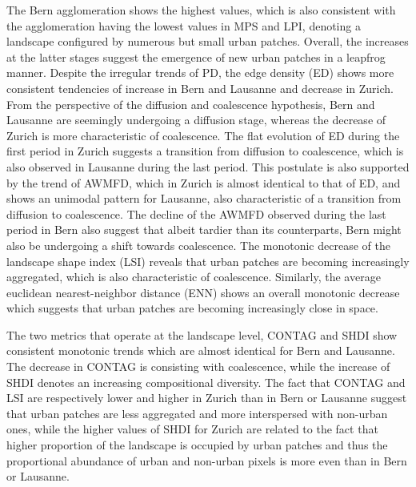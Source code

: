 \documentclass[10pt,letterpaper]{article}
\begin{document}
The Bern agglomeration shows the highest values, which is also consistent with the agglomeration having the lowest values in MPS and LPI, denoting a landscape configured by numerous but small urban patches.
Overall, the increases at the latter stages suggest the emergence of new urban patches in a leapfrog manner.
Despite the irregular trends of PD, the edge density (ED) shows more consistent tendencies of increase in Bern and Lausanne and decrease in Zurich. From the perspective of the diffusion and coalescence hypothesis, Bern and Lausanne are seemingly undergoing a diffusion stage, whereas the decrease of Zurich is more characteristic of coalescence. %
The flat evolution of ED during the first period in Zurich suggests a transition from diffusion to coalescence, which is also observed in Lausanne during the last period.
This postulate is also supported by the trend of AWMFD, which in Zurich is almost identical to that of ED, and shows an unimodal pattern for Lausanne, also characteristic of a transition from diffusion to coalescence. The decline of the AWMFD observed during the last period in Bern also suggest that albeit tardier than its counterparts, Bern might also be undergoing a shift towards coalescence.
The monotonic decrease of the landscape shape index (LSI) reveals that urban patches are becoming increasingly aggregated, which is also characteristic of coalescence. Similarly, the average euclidean nearest-neighbor distance (ENN) shows an overall monotonic decrease which suggests that urban patches are becoming increasingly close in space. %

The two metrics that operate at the landscape level, CONTAG and SHDI show consistent monotonic trends which are almost identical for Bern and Lausanne. The decrease in CONTAG is consisting with coalescence, %
while the increase of SHDI denotes an increasing compositional diversity. %
The fact that CONTAG and LSI are respectively lower and higher in Zurich than in Bern or Lausanne suggest that urban patches are less aggregated and more interspersed with non-urban ones, while the higher values of SHDI for Zurich are related to the fact that higher proportion of the landscape is occupied by urban patches and thus the proportional abundance of urban and non-urban pixels is more even than in Bern or Lausanne.
\end{document}
